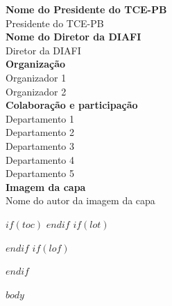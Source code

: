 \documentclass[$if(fontsize)$$fontsize$,$endif$$if(lang)$$lang$,$endif$$if(papersize)$$papersize$,$endif$$for(classoption)$$classoption$$sep$,$endfor$]{$documentclass$}
\begin{document}
\vspace*{\fill}
\begin{center}
	{\large \textbf{Nome do Presidente do TCE-PB}} \\
	{\normalsize {Presidente do TCE-PB}} \\
	\vspace{1cm}
	{\large \textbf{Nome do Diretor da DIAFI}} \\
	{\normalsize {Diretor da DIAFI}} \\
	\vspace{1cm}
	{\large \textbf{Organização}} \\
	{\normalsize {Organizador 1}} \\
	{\normalsize {Organizador 2}} \\
	\vspace{1cm}
	{\large \textbf{Colaboração e participação}} \\
	{\normalsize {Departamento 1}} \\
	{\normalsize {Departamento 2}} \\
	{\normalsize {Departamento 3}} \\
	{\normalsize {Departamento 4}} \\
	{\normalsize {Departamento 5}} \\
	\vspace{1cm}
	{\large \textbf{Imagem da capa}} \\
	{\normalsize {Nome do autor da imagem da capa}} \\
		\vspace{1cm}
\end{center}

\vspace*{\fill}

\newpage


$if(toc)$
{
\thispagestyle{plain}
\hypersetup{linkcolor=black}
\setcounter{tocdepth}{$toc-depth$}
\tableofcontents
}
$endif$
$if(lot)${
\hypersetup{linkcolor=black}
\listoftables
}
$endif$
$if(lof)$
\hypersetup{linkcolor=black}
\listoffigures
$endif$

\newpage

\setlength{\parindent}{4em}
\setlength{\parskip}{1em}



\fancyhead[L]{\truncate{0.45\headwidth}\rightmark}
\fancyhead[R]{\truncate{0.5\headwidth}\leftmark}



$body$
\end{document}
